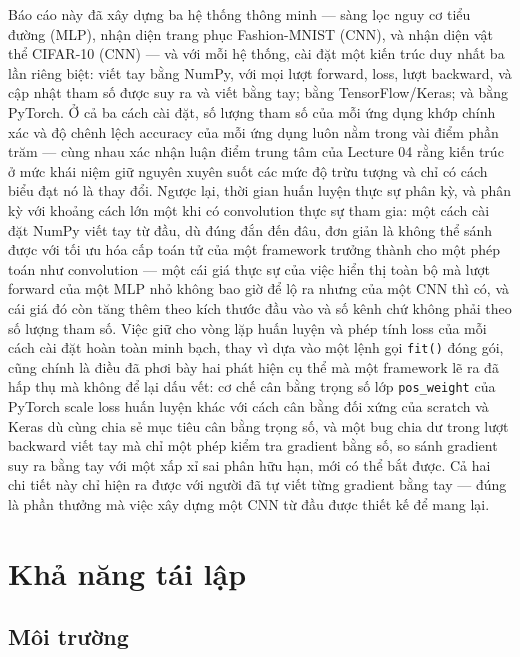 \documentclass[11pt]{article}
\newcommand{\code}[1]{\texttt{#1}}
\begin{document}
Báo cáo này đã xây dựng ba hệ thống thông minh — sàng lọc nguy cơ tiểu
đường (MLP), nhận diện trang phục Fashion-MNIST (CNN), và nhận diện vật
thể CIFAR-10 (CNN) — và với mỗi hệ thống, cài đặt một kiến trúc duy nhất
ba lần riêng biệt: viết tay bằng NumPy, với mọi lượt forward, loss, lượt
backward, và cập nhật tham số được suy ra và viết bằng tay; bằng
TensorFlow/Keras; và bằng PyTorch. Ở cả ba cách cài đặt, số lượng tham số
của mỗi ứng dụng khớp chính xác và độ chênh lệch accuracy của mỗi ứng dụng
luôn nằm trong vài điểm phần trăm — cùng nhau xác nhận luận điểm trung tâm
của Lecture 04 rằng kiến trúc ở mức khái niệm giữ nguyên xuyên suốt các
mức độ trừu tượng và chỉ có cách biểu đạt nó là thay đổi. Ngược lại, thời
gian huấn luyện thực sự phân kỳ, và phân kỳ với khoảng cách lớn một khi có
convolution thực sự tham gia: một cách cài đặt NumPy viết tay từ đầu, dù
đúng đắn đến đâu, đơn giản là không thể sánh được với tối ưu hóa cấp toán
tử của một framework trưởng thành cho một phép toán như convolution — một
cái giá thực sự của việc hiển thị toàn bộ mà lượt forward của một MLP nhỏ
không bao giờ để lộ ra nhưng của một CNN thì có, và cái giá đó còn tăng
thêm theo kích thước đầu vào và số kênh chứ không phải theo số lượng tham
số. Việc giữ cho vòng lặp huấn luyện và phép tính loss của mỗi cách cài
đặt hoàn toàn minh bạch, thay vì dựa vào một lệnh gọi \code{fit()} đóng
gói, cũng chính là điều đã phơi bày hai phát hiện cụ thể mà một framework
lẽ ra đã hấp thụ mà không để lại dấu vết: cơ chế cân bằng trọng số lớp
\code{pos\_weight} của PyTorch scale loss huấn luyện khác với cách cân
bằng đối xứng của scratch và Keras dù cùng chia sẻ mục tiêu cân bằng
trọng số, và một bug chia dư trong lượt backward viết tay mà chỉ một phép
kiểm tra gradient bằng số, so sánh gradient suy ra bằng tay với một xấp xỉ
sai phân hữu hạn, mới có thể bắt được. Cả hai chi tiết này chỉ hiện ra
được với người đã tự viết từng gradient bằng tay — đúng là phần thưởng mà
việc xây dựng một CNN từ đầu được thiết kế để mang lại.

\section{Khả năng tái lập}

\subsection{Môi trường}
\end{document}
